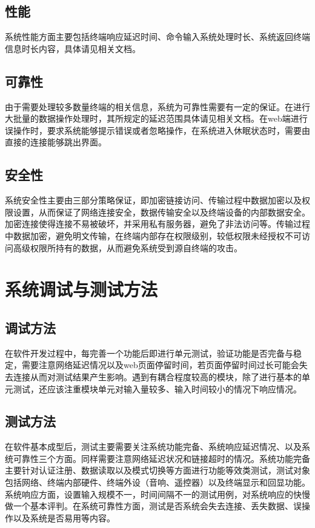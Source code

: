 \documentclass[UTF8]{ctexart}
\newcommand{\note}[1]{\textcolor{blue}{\emph{[#1]}}}   %
\begin{document}
    \subsection{性能}
    \par{系统性能方面主要包括终端响应延迟时间、命令输入系统处理时长、系统返回终端信息时长内容，具体请见相关文档。}
    \subsection{可靠性}
	 \par{由于需要处理较多数量终端的相关信息，系统为可靠性需要有一定的保证。在进行大批量的数据操作处理时，其所规定的延迟范围具体请见相关文档。在web端进行误操作时，要求系统能够提示错误或者忽略操作，在系统进入休眠状态时，需要由直接的连接能够跳出界面。}
    \subsection{安全性}
    \par{系统安全性主要由三部分策略保证，即加密链接访问、传输过程中数据加密以及权限设置，从而保证了网络连接安全，数据传输安全以及终端设备的内部数据安全。加密连接使得连接不易被破坏，并采用私有服务器，避免了非法访问等。传输过程中数据加密，避免明文传输，在终端内部存在权限级别，较低权限未经授权不可访问高级权限所持有的数据，从而避免系统受到源自终端的攻击。}

    
    \newpage
    \section{系统调试与测试方法}
		\subsection{调试方法}
		\par{在软件开发过程中，每完善一个功能后即进行单元测试，验证功能是否完备与稳定，需要注意网络延迟情况以及web页面停留时间，若页面停留时间过长可能会失去连接从而对测试结果产生影响。遇到有耦合程度较高的模块，除了进行基本的单元测试，还应该注重模块单元对输入量较多、输入时间较小的情况下响应情况。}
		\subsection{测试方法}
		\par{在软件基本成型后，测试主要需要关注系统功能完备、系统响应延迟情况、以及系统可靠性三个方面。同样需要注意网络延迟状况和链接超时的情况。系统功能完备主要针对认证注册、数据读取以及模式切换等方面进行功能等效类测试，测试对象包括网络、终端内部硬件、终端外设（音响、遥控器）以及终端显示和回显功能。系统响应方面，设置输入规模不一，时间间隔不一的测试用例，对系统响应的快慢做一个基本评判。在系统可靠性方面，测试是否系统会失去连接、丢失数据、误操作以及系统是否易用等内容。}
\end{document}
